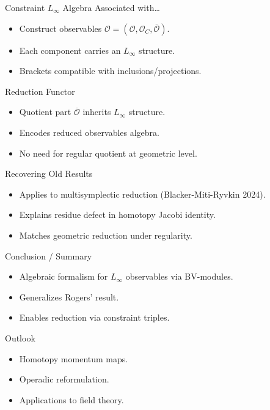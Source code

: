 \documentclass[handout,10pt]{beamer}
\begin{document}
\begin{frame}{Constraint $L_\infty$ Algebra Associated with…}
\begin{itemize}
  \item Construct observables $\mathcal{O} = (\mathcal{O}, \mathcal{O}_C, \overline{\mathcal{O}})$.
  \item Each component carries an $L_\infty$ structure.
  \item Brackets compatible with inclusions/projections.
\end{itemize}
\end{frame}

\begin{frame}{Reduction Functor}
\begin{itemize}
  \item Quotient part $\overline{\mathcal{O}}$ inherits $L_\infty$ structure.
  \item Encodes reduced observables algebra.
  \item No need for regular quotient at geometric level.
\end{itemize}
\end{frame}

\begin{frame}{Recovering Old Results}
\begin{itemize}
  \item Applies to multisymplectic reduction (Blacker-Miti-Ryvkin 2024).
  \item Explains residue defect in homotopy Jacobi identity.
  \item Matches geometric reduction under regularity.
\end{itemize}
\end{frame}

\begin{frame}{Conclusion / Summary}
\begin{itemize}
  \item Algebraic formalism for $L_\infty$ observables via BV-modules.
  \item Generalizes Rogers' result.
  \item Enables reduction via constraint triples.
\end{itemize}
\end{frame}

\begin{frame}{Outlook}
\begin{itemize}
  \item Homotopy momentum maps.
  \item Operadic reformulation.
  \item Applications to field theory.
\end{itemize}
\end{frame}


\end{document}
